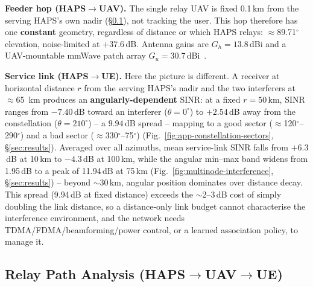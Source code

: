 \documentclass[]{ieeeaccess}
\begin{document}
\textbf{Feeder hop (HAPS$\to$UAV).} The single relay UAV is fixed 0.1\,km from the serving HAPS's own nadir (\S\ref{sec:relay-path-analysis}), not tracking the user. This hop therefore has one \textbf{constant} geometry, regardless of distance or which HAPS relays: $\approx$89.71$^\circ$ elevation, noise-limited at $+37.6$\,dB. Antenna gains are $G_h=13.8$\,dBi and a UAV-mountable mmWave patch array $G_u=30.7$\,dBi~\cite{anim2021uav}.

\textbf{Service link (HAPS$\to$UE).} Here the picture is different. A receiver at horizontal distance $r$ from the serving HAPS's nadir and the two interferers at $\approx$65~km produces an \textbf{angularly-dependent} SINR: at a fixed $r=50$\,km, SINR ranges from $-7.40$\,dB toward an interferer ($\theta=0^\circ$) to $+2.54$\,dB away from the constellation ($\theta=210^\circ$) -- a $9.94$\,dB spread -- mapping to a good sector ($\approx$120$^\circ$--290$^\circ$) and a bad sector ($\approx$330$^\circ$--75$^\circ$) (Fig.~\ref{fig:app-constellation-sectors}, \S\ref{sec:results}). Averaged over all azimuths, mean service-link SINR falls from $+6.3$\,dB at 10\,km to $-4.3$\,dB at 100\,km, while the angular min--max band widens from 1.95\,dB to a peak of 11.94\,dB at 75\,km (Fig.~\ref{fig:multinode-interference}, \S\ref{sec:results}) -- beyond $\sim$30\,km, angular position dominates over distance decay. This spread (9.94\,dB at fixed distance) exceeds the $\sim$2--3\,dB cost of simply doubling the link distance, so a distance-only link budget cannot characterise the interference environment, and the network needs TDMA/FDMA/beamforming/power control, or a learned association policy, to manage it.

\subsection{Relay Path Analysis (HAPS$\to$UAV$\to$UE)}
\label{sec:relay-path-analysis}
\end{document}
